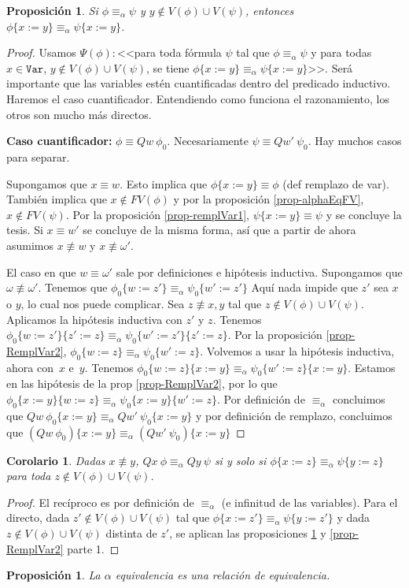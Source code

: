 \documentclass[a4paper, 12pt]{report}
\newtheorem{corolario}[teorema]{Corolario}
\newtheorem{prop}[teorema]{Proposición}
\theoremstyle{definition}
\begin{document}
\begin{prop}\label{prop-AlphaEquivRempl}
	Si $\phi\equiv_\alpha\psi$ y $y\not\in V(\phi)\cup V(\psi)$, entonces $\phi\{x:=y\}\equiv_\alpha\psi\{x:=y\}$.
\end{prop}
\begin{proof}
	Usamos $\Psi(\phi):$<<para toda fórmula $\psi$ tal que $\phi\equiv_\alpha\psi$ y para todas $x\in\mathtt{Var}$, $y\not\in V(\phi)\cup V(\psi)$, se tiene $\phi\{x:=y\}\equiv_\alpha\psi\{x:=y\}$>>. Será importante que las variables estén cuantificadas dentro del predicado inductivo. Haremos el caso cuantificador. Entendiendo como funciona el razonamiento, los otros son mucho más directos.
	
	\textbf{Caso cuantificador:} $\phi\equiv Qw~\phi_0$. Necesariamente $\psi\equiv Qw'~\psi_0$. Hay muchos casos para separar.
	
	Supongamos que $x\equiv w$. Esto implica que $\phi\{x:=y\}\equiv\phi$ (def remplazo de var). También implica que $x\not\in FV(\phi)$ y por la proposición \ref{prop-alphaEqFV}, $x\not\in FV(\psi)$. Por la proposición \ref{prop-remplVar1}, $\psi\{x:=y\}\equiv\psi$ y se concluye la tesis. Si $x\equiv w'$ se concluye de la misma forma, así que a partir de ahora asumimos $x\not\equiv w$ y $x\not\equiv\omega'$.
	
	El caso en que $w\equiv\omega'$ sale por definiciones e hipótesis inductiva. Supongamos que $\omega\not\equiv\omega'$. Tenemos que $\phi_0\{w:=z'\}\equiv_\alpha\psi_0\{w':=z'\}$ Aquí nada impide que $z'$ sea $x$ o $y$, lo cual nos puede complicar. Sea $z\not\equiv x,y$ tal que $z\not\in V(\phi)\cup V(\psi)$. Aplicamos la hipótesis inductiva con $z'$ y $z$. Tenemos $\phi_0\{w:=z'\}\{z':=z\}\equiv_\alpha\psi_0\{w':=z'\}\{z':=z\}$. Por la proposición \ref{prop-RemplVar2}, $\phi_0\{w:=z\}\equiv_\alpha\psi_0\{w':=z\}$. Volvemos a usar la hipótesis inductiva, ahora con~$x$ e~$y$. Tenemos $\phi_0\{w:=z\}\{x:=y\}\equiv_\alpha\psi_0\{w':=z\}\{x:=y\}$. Estamos en las hipótesis de la prop \ref{prop-RemplVar2}, por lo que $\phi_0\{x:=y\}\{w:=z\}\equiv_\alpha\psi_0\{x:=y\}\{w':=z\}$. Por definición de $\equiv_\alpha$ concluimos que $Qw~\phi_0\{x:=y\}\equiv_\alpha Qw'~\psi_0\{x:=y\}$ y por definición de remplazo, concluimos que $(Qw~\phi_0)\{x:=y\}\equiv_\alpha (Qw'~\psi_0)\{x:=y\}$
\end{proof}
\begin{corolario}
	Dadas $x\not\equiv y$, $Qx~\phi \equiv_\alpha Qy~\psi$ si y solo si $\phi\{x:=z\}\equiv_\alpha\psi\{y:=z\}$ para toda $z\not\in V(\phi)\cup V(\psi)$.
\end{corolario}
\begin{proof}
	El recíproco es por definición de $\equiv_\alpha$ (e infinitud de las variables). Para el directo, dada $z'\not\in V(\phi)\cup V(\psi)$ tal que $\phi\{x:=z'\}\equiv_\alpha\psi\{y:=z'\}$ y dada $z\not\in V(\phi)\cup V(\psi)$ distinta de $z'$, se aplican las proposiciones \ref{prop-AlphaEquivRempl} y \ref{prop-RemplVar2} parte 1.
\end{proof}
\begin{prop}
	La $\alpha$ equivalencia es una relación de equivalencia.
\end{prop}
\end{document}
